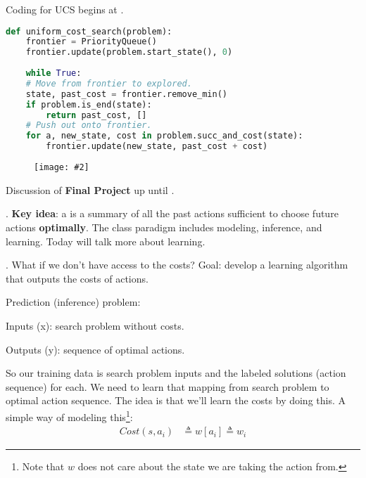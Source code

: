 \documentclass[11pt]{article}
\newcommand\myfig[2][0.3\textwidth]{\begin{figure}[h!]\centering\texttt{[image: \#2]}\end{figure}}
\newcommand\myspace[1][]{\vspace{#1\bigskipamount}\Needspace{10\baselineskip}}
\newcommand\p{\Needspace{10\baselineskip} \noindent}
\begin{document}
\myspace
Coding for UCS begins at . 

\begin{lstlisting}[language=Python]
def uniform_cost_search(problem):
	frontier = PriorityQueue()
	frontier.update(problem.start_state(), 0)
	
	while True:
	# Move from frontier to explored.
	state, past_cost = frontier.remove_min()
	if problem.is_end(state):
		return past_cost, []
	# Push out onto frontier.
	for a, new_state, cost in problem.succ_and_cost(state):
		frontier.update(new_state, past_cost + cost)
\end{lstlisting}

\myfig[0.4\textwidth]{figs/search_ucs.png}






\p Discussion of \textbf{Final Project} up until . 

\myspace
\p {}. \textbf{Key idea}: a  is a summary of all the past actions sufficient to choose future actions \textbf{optimally}. The class paradigm includes modeling, inference, and learning. Today will talk more about learning. 

\myspace
\p {} . What if we don't have access to the costs? Goal: develop a learning algorithm that outputs the costs of actions.  

Prediction (inference) problem:
\begin{compactitem}
	\item Inputs (x): search problem without costs.
	\item Outputs (y): sequence of optimal actions.
\end{compactitem}
So our training data is search problem inputs and the labeled solutions (action sequence) for each. We need to learn that mapping from search problem to optimal action sequence. The idea is that we'll learn the costs by doing this. A simple way of modeling this\footnote{Note that $w$ does not care about the state we are taking the action from.}:
\begin{align}
	Cost(s, a_i) &\triangleq w[a_i] \triangleq w_i 
\end{align}
\end{document}
